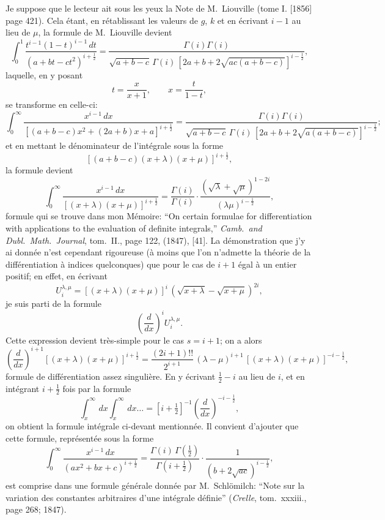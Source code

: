 \documentclass[11pt,a4paper]{book}
\begin{document}
Je suppose que le lecteur ait sous les yeux la Note de M.~Liouville (tome I. [1856] page 421). Cela \'{e}tant, en r\'{e}tablissant les valeurs de $g$, $k$ et en \'{e}crivant $i-1$ au lieu de $\mu$, la formule de M.~Liouville devient
\begin{equation}
\int_0^1\frac{t^{i-1}(1-t)^{i-1}\,dt}{(a+bt-ct^2)^{i+\frac{1}{2}}}
=\frac{\Gamma(i)\Gamma(i)}{\sqrt{a+b-c}\,\Gamma(i)\,[2a+b+2\sqrt{ac(a+b-c)}]^{i-\frac{1}{2}}},
\end{equation}
laquelle, en y posant
\[
t=\frac{x}{x+1},\qquad x=\frac{t}{1-t},
\]
se transforme en celle-ci:
\begin{equation}
\int_0^{\infty}\frac{x^{i-1}\,dx}{[(a+b-c)x^2+(2a+b)x+a]^{i+\frac{1}{2}}}
=\frac{\Gamma(i)\Gamma(i)}{\sqrt{a+b-c}\,\Gamma(i)\,[2a+b+2\sqrt{a(a+b-c)}]^{i-\frac{1}{2}}};
\end{equation}
et en mettant le d\'{e}nominateur de l'int\'{e}grale sous la forme
\[
[(a+b-c)(x+\lambda)(x+\mu)]^{i+\frac{1}{2}},
\]
la formule devient
\begin{equation}
\int_0^{\infty}\frac{x^{i-1}\,dx}{[(x+\lambda)(x+\mu)]^{i+\frac{1}{2}}}
=\frac{\Gamma(i)}{\Gamma(i)}\cdot\frac{(\sqrt{\lambda}+\sqrt{\mu})^{1-2i}}{(\lambda\mu)^{i-\frac{1}{2}}},
\end{equation}
formule qui se trouve dans mon M\'{e}moire: ``On certain formulae for differentiation with applications to the evaluation of definite integrals,'' \textit{Camb.\ and Dubl.\ Math.\ Journal}, tom.~II., page 122, (1847), [41]. La d\'{e}monstration que j'y ai donn\'{e}e n'est cependant rigoureuse (\`{a} moins que l'on n'admette la th\'{e}orie de la diff\'{e}rentiation \`{a} indices quelconques) que pour le cas de $i+1$ \'{e}gal \`{a} un entier positif; en effet, en \'{e}crivant
\[
U^{\lambda,\mu}_i=[(x+\lambda)(x+\mu)]^{i}\,(\sqrt{x+\lambda}-\sqrt{x+\mu})^{2i},
\]
je suis parti de la formule
\[
\left(\frac{d}{dx}\right)^i U^{\lambda,\mu}_i.
\]
Cette expression devient tr\`{e}s-simple pour le cas $s=i+1$; on a alors
\begin{equation}
\left(\frac{d}{dx}\right)^{i+1}[(x+\lambda)(x+\mu)]^{i+\frac{1}{2}}
=\frac{(2i+1)!!}{2^{i+1}}\,(\lambda-\mu)^{i+1}\,[(x+\lambda)(x+\mu)]^{-i-\frac{1}{2}},
\end{equation}
formule de diff\'{e}rentiation assez singuli\`{e}re. En y \'{e}crivant $\frac{1}{2}-i$ au lieu de $i$, et en int\'{e}grant $i+\frac{1}{2}$ fois par la formule
\[
\int^{\infty}_x\,dx\int^{\infty}_x\,dx\ldots=[i+\tfrac{1}{2}]^{-1}\left(\frac{d}{dx}\right)^{-i-\frac{1}{2}},
\]
on obtient la formule int\'{e}grale ci-devant mentionn\'{e}e. Il convient d'ajouter que cette formule, repr\'{e}sent\'{e}e sous la forme
\begin{equation}
\int_0^{\infty}\frac{x^{i-1}\,dx}{(ax^2+bx+c)^{i+\frac{1}{2}}}
=\frac{\Gamma(i)\,\Gamma(\frac{1}{2})}{\Gamma(i+\frac{1}{2})}\cdot\frac{1}{(b+2\sqrt{ac})^{i-\frac{1}{2}}},
\end{equation}
est comprise dans une formule g\'{e}n\'{e}rale donn\'{e}e par M.~Schl\"{o}milch: ``Note sur la variation des constantes arbitraires d'une int\'{e}grale d\'{e}finie'' (\textit{Crelle}, tom.~xxxiii., page 268; 1847).
\end{document}
